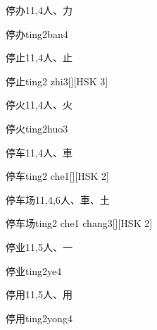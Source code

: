 \begin{entry}{停办}{11,4}{⼈、⼒}
  \begin{phonetics}{停办}{ting2ban4}
  \end{phonetics}
\end{entry}

\begin{entry}{停止}{11,4}{⼈、⽌}
  \begin{phonetics}{停止}{ting2 zhi3}[][HSK 3]
  \end{phonetics}
\end{entry}

\begin{entry}{停火}{11,4}{⼈、⽕}
  \begin{phonetics}{停火}{ting2huo3}
  \end{phonetics}
\end{entry}

\begin{entry}{停车}{11,4}{⼈、⾞}
  \begin{phonetics}{停车}{ting2 che1}[][HSK 2]
  \end{phonetics}
\end{entry}

\begin{entry}{停车场}{11,4,6}{⼈、⾞、⼟}
  \begin{phonetics}{停车场}{ting2 che1 chang3}[][HSK 2]
  \end{phonetics}
\end{entry}

\begin{entry}{停业}{11,5}{⼈、⼀}
  \begin{phonetics}{停业}{ting2ye4}
  \end{phonetics}
\end{entry}

\begin{entry}{停用}{11,5}{⼈、⽤}
  \begin{phonetics}{停用}{ting2yong4}
  \end{phonetics}
\end{entry}

